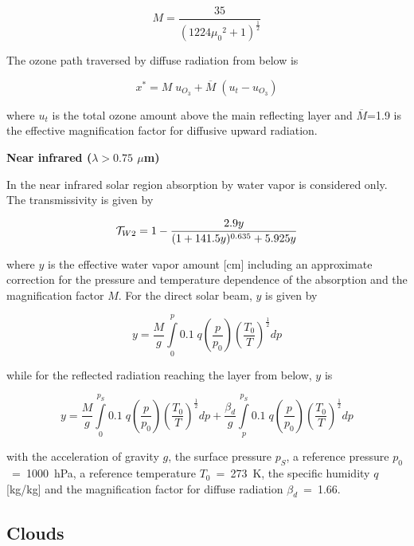\begin{equation}
M= \frac{35}{(1224 {\mu_0}^2 +1)^{\frac{1}{2}}}
\end{equation}

The ozone path traversed by diffuse radiation from
below is

\begin{equation}
x^{*}=M \; u_{O_3}+\overline{M} \; (u_t -u_{O_3})
\end{equation}

where $u_t$ is the total ozone amount above the main
reflecting layer and $\overline{M}$=1.9
is the effective magnification factor for diffusive
upward radiation.

{\bf  Near infrared ($\lambda > 0.75$ $\mu$m)}

In the near infrared solar region  absorption by water
vapor
is considered only. The transmissivity is given by

\begin{equation}
{\cal T}_{W2}=1-\frac{2.9 y}{(1+141.5y)^{0.635} +
5.925y}
\end{equation}

where $y$ is the effective water vapor amount [cm]
including an approximate correction for the
pressure and temperature dependence of the absorption
and the magnification factor $M$. For 
the direct solar beam, $y$ is given by

\begin{equation}
y=\frac{M}{g}
 \int\limits^p_0 0.1 \; q
\left(\frac{p}{p_0}\right)\left(\frac{T_0}{T}\right)^
{\frac{1}{2}} dp
\end{equation}

while for the reflected radiation reaching the layer from
below, $y$ is 

\begin{equation}
y=\frac{M}{g}
 \int\limits^{p_S}_0
 0.1 \; q
\left(\frac{p}{p_0}\right)\left(\frac{T_0}{T}\right)^
{\frac{1}{2}} dp
+
\frac{\beta_d}{g} \int\limits^{p_S}_{p}
 0.1 \; q
\left(\frac{p}{p_0}\right)\left(\frac{T_0}{T}\right)^
{\frac{1}{2}} dp
\end{equation}

with the acceleration of gravity $g$, the surface
pressure $p_S$, a reference pressure
$p_0$~=~1000~hPa, a  reference temperature
$T_0$~=~273~K, the  specific humidity $q$ 
[kg/kg] and the magnification factor for diffuse
radiation $\beta_d$~=~1.66. 

\subsection*{Clouds}

